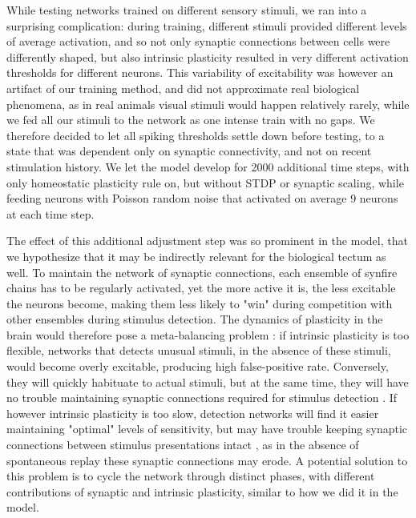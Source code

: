 \documentclass{article}
\begin{document}
While testing networks trained on different sensory stimuli, we ran into a surprising complication: during training, different stimuli provided different levels of average activation, and so not only synaptic connections between cells were differently shaped, but also intrinsic plasticity resulted in very different activation thresholds for different neurons. This variability of excitability was however an artifact of our training method, and did not approximate real biological phenomena, as in real animals visual stimuli would happen relatively rarely, while we fed all our stimuli to the network as one intense train with no gaps. We therefore decided to let all spiking thresholds settle down before testing, to a state that was dependent only on synaptic connectivity, and not on recent stimulation history. We let the model develop for 2000 additional time steps, with only homeostatic plasticity rule on, but without STDP or synaptic scaling, while feeding neurons with Poisson random noise that activated on average 9 neurons at each time step. 

The effect of this additional adjustment step was so prominent in the model, that we hypothesize that it may be indirectly relevant for the biological tectum as well. To maintain the network of synaptic connections, each ensemble of synfire chains has to be regularly activated, yet the more active it is, the less excitable the neurons become, making them less likely to "win" during competition with other ensembles during stimulus detection. The dynamics of plasticity in the brain would therefore pose a meta-balancing problem \citep{zenke2017temporal}: if intrinsic plasticity is too flexible, networks that detects unusual stimuli, in the absence of these stimuli, would become overly excitable, producing high false-positive rate. Conversely, they will quickly habituate to actual stimuli, but at the same time, they will have no trouble maintaining synaptic connections required for stimulus detection \citep{litwin2014assemblies}. If however intrinsic plasticity is too slow, detection networks will find it easier maintaining "optimal" levels of sensitivity, but may have trouble keeping synaptic connections between stimulus presentations intact \citep{triplett2018emergence}, as in the absence of spontaneous replay these synaptic connections may erode. A potential solution to this problem is to cycle the network through distinct phases, with different contributions of synaptic and intrinsic plasticity, similar to how we did it in the model.
\end{document}

